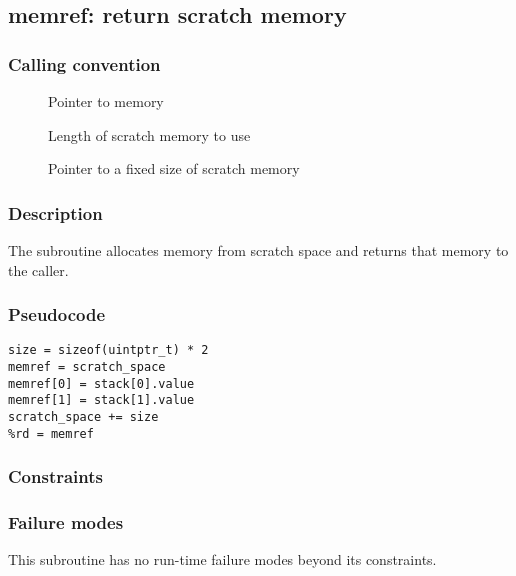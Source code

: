 \clearpage
{}
{}
\label{subr:memref}
\subsection*{memref: return scratch memory}

\subsubsection*{Calling convention}

\begin{description}
\item[] Pointer to memory
\item[] Length of scratch memory to use
\item[] Pointer to a fixed size of scratch memory
\end{description}

\subsubsection*{Description}

The  subroutine allocates memory from scratch
space and returns that memory to the caller.
\subsubsection*{Pseudocode}

\begin{verbatim}
size = sizeof(uintptr_t) * 2
memref = scratch_space
memref[0] = stack[0].value
memref[1] = stack[1].value
scratch_space += size
%rd = memref
\end{verbatim}

\subsubsection*{Constraints}

\subsubsection*{Failure modes}

This subroutine has no run-time failure modes beyond its constraints.
